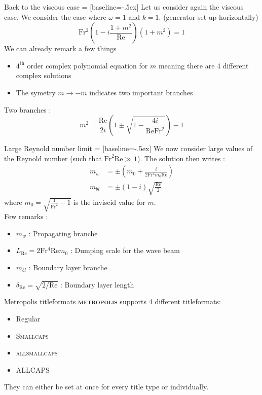 \documentclass[10pt]{beamer}
\newcommand{\themename}{\textbf{\textsc{metropolis}}\xspace}
\begin{document}
\begin{frame}[fragile]{Back to the viscous case}
   = [baseline=-.5ex]
  Let us consider again the viscous case. We consider the case where $\omega=1$ and $k=1$. (generator set\--up horizontally)
  \begin{equation*}
    \mathrm{Fr^{2}}\left(1-i\frac{1+m^{2}}{\mathrm{Re}}\right)\left(1+m^{2}\right)=1
  \end{equation*}
  We can already remark a few things
  \begin{itemize}
    \item $4^{\mathrm{th}}$ order complex polynomial equation for $m$ meaning there are 4 different complex solutions
    \item The symetry $m\to-m$ indicates two important branches
  \end{itemize}
  Two branches :
  \begin{equation*}
    m^{2}=\frac{\mathrm{Re}}{2i}\left(1\pm\sqrt{1-\frac{4i}{\mathrm{Re}\mathrm{Fr}^{2}}}\right)-1
  \end{equation*}
\end{frame}

\begin{frame}[fragile]{Large Reynold number limit}
   = [baseline=-.5ex]
  We now consider large values of the Reynold number (such that $\mathrm{Fr}^2\mathrm{Re}\gg1$). The solution then writes :
  \begin{align*}
    m_{w}&=\pm\left(m_{0}+\frac{i}{2\mathrm{Fr^{4}}m_{0}\mathrm{Re}}\right)\\
    m_{bl}&=\pm \left(1-i\right)\sqrt{\frac{\mathrm{Re}}{2}}
  \end{align*}
  where $m_{0}=\sqrt{\frac{1}{\mathrm{Fr}^{2}}-1}$ is the inviscid value for $m$.\\
  Few remarks :
  \begin{itemize}
    \item $m_{w}$ : Propagating branche
    \item $L_{\mathrm{Re}}=2\mathrm{Fr^{4}}\mathrm{Re}m_{0}$ : Dumping scale for the wave beam
    \item $m_{bl}$ : Boundary layer branche
    \item $\delta_{\mathrm{Re}}=\sqrt{2/\mathrm{Re}}$ : Boundary layer length
  \end{itemize}
\end{frame}


\begin{frame}{Metropolis titleformats}
	\themename supports 4 different titleformats:
	\begin{itemize}
		\item Regular
		\item \textsc{Smallcaps}
		\item \textsc{allsmallcaps}
		\item ALLCAPS
	\end{itemize}
	They can either be set at once for every title type or individually.
\end{frame}
\end{document}
